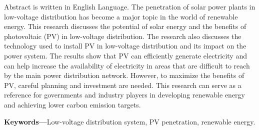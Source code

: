 {
Abstract is written in English Language. The penetration of solar power plants in low-voltage distribution has become a major topic in the world of renewable energy. This research discusses the potential of solar energy and the benefits of photovoltaic (PV) in low-voltage distribution. The research also discusses the technology used to install PV in low-voltage distribution and its impact on the power system. The results show that PV can efficiently generate electricity and can help increase the availability of electricity in areas that are difficult to reach by the main power distribution network. However, to maximize the benefits of PV, careful planning and investment are needed. This research can serve as a reference for governments and industry players in developing renewable energy and achieving lower carbon emission targets.

\noindent\textbf{Keywords---}Low-voltage distribution system, PV penetration, renewable energy.
}
